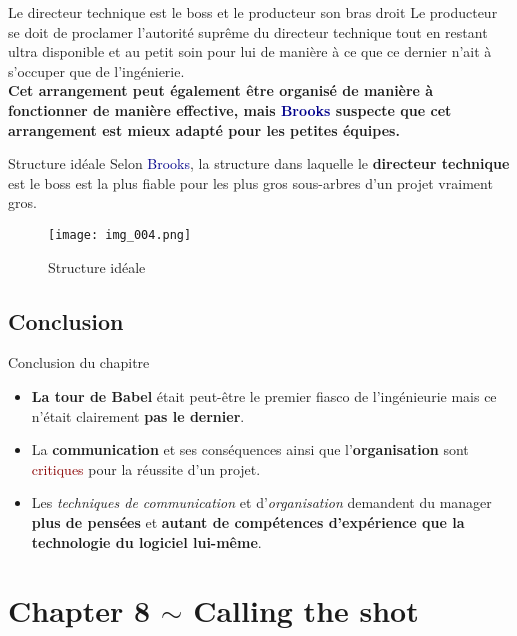 \documentclass{beamer}
\newcommand{\blu}[1]{\textcolor{darkblue}{#1}}
\newcommand{\red}[1]{\textcolor{darkred}{#1}}
\begin{document}
\begin{frame}{Le directeur technique est le boss et le producteur son bras droit}
Le producteur se doit de proclamer l'autorité suprême du directeur technique tout en restant ultra disponible et au petit soin 
pour lui de manière à ce que ce dernier n'ait à s'occuper que de l'ingénierie.\\
$ $ \\
\textbf{Cet arrangement peut également être organisé de manière à fonctionner de manière effective, mais \blu{Brooks} suspecte que 
cet arrangement est mieux adapté pour les petites équipes.}
\end{frame}

\begin{frame}{Structure idéale}
Selon \blu{Brooks}, la structure dans laquelle le \textbf{directeur technique} est le boss est la plus fiable pour les plus gros 
sous-arbres d'un projet vraiment gros.
\begin{figure}
    \begin{center}
    \texttt{[image: img\_004.png]}
    \caption{Structure idéale}
    \end{center}	
\end{figure}
\end{frame}

\subsection*{Conclusion}

\begin{frame}{Conclusion du chapitre}
\begin{itemize}
\item \textbf{La tour de Babel} était peut-être le premier fiasco de l'ingénieurie mais ce n'était clairement \textbf{pas le 
dernier}.
\item La \textbf{communication} et ses conséquences ainsi que l'\textbf{organisation} sont \red{critiques} pour la réussite d'un 
projet.
\item Les \textit{techniques de communication} et d'\textit{organisation} demandent du manager \textbf{plus de pensées} et 
\textbf{autant de compétences d'expérience que la technologie du logiciel lui-même}.
\end{itemize}
\end{frame}


\section{Chapter 8 $\sim$ Calling the shot}
\end{document}
